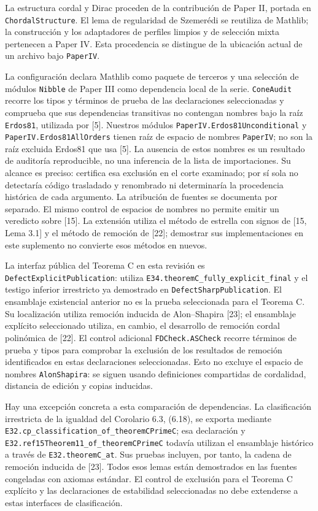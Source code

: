\documentclass[spanish,11pt,a4paper]{article}
\begin{document}
La estructura cordal y Dirac proceden de la contribución de Paper II,
portada en \nolinkurl{ChordalStructure}. El lema de regularidad de
Szemerédi se reutiliza de Mathlib; la construcción y los adaptadores de
perfiles limpios y de selección mixta pertenecen a Paper IV. Esta
procedencia se distingue de la ubicación actual de un archivo bajo
\nolinkurl{PaperIV}.

La configuración declara Mathlib como paquete de terceros y una
selección de módulos \nolinkurl{Nibble} de Paper III como dependencia local
de la serie. \nolinkurl{ConeAudit} recorre los tipos y términos de prueba
de las declaraciones seleccionadas y comprueba que sus dependencias
transitivas no contengan nombres bajo la raíz \nolinkurl{Erdos81},
utilizada por {[}5{]}. Nuestros módulos
\nolinkurl{PaperIV.Erdos81Unconditional} y
\nolinkurl{PaperIV.Erdos81AllOrders} tienen raíz de espacio de nombres
\nolinkurl{PaperIV}; no son la raíz excluida Erdos81 que usa {[}5{]}. La
ausencia de estos nombres es un resultado de auditoría reproducible, no
una inferencia de la lista de importaciones. Su alcance es preciso:
certifica esa exclusión en el corte examinado; por sí sola no detectaría
código trasladado y renombrado ni determinaría la procedencia histórica
de cada argumento. La atribución de fuentes se documenta por separado.
El mismo control de espacios de nombres no permite emitir un veredicto
sobre {[}15{]}. La extensión utiliza el método de estrella con signos de
{[}15, Lema 3.1{]} y el método de remoción de {[}22{]}; demostrar sus
implementaciones en este suplemento no convierte esos métodos en nuevos.

La interfaz pública del Teorema C en esta revisión es
\nolinkurl{DefectExplicitPublication}: utiliza
\nolinkurl{E34.theoremC_fully_explicit_final} y el testigo inferior
irrestricto ya demostrado en \nolinkurl{DefectSharpPublication}. El
ensamblaje existencial anterior no es la prueba seleccionada para el
Teorema C. Su localización utiliza remoción inducida de Alon--Shapira
{[}23{]}; el ensamblaje explícito seleccionado utiliza, en cambio, el
desarrollo de remoción cordal polinómica de {[}22{]}. El control
adicional \nolinkurl{FDCheck.ASCheck} recorre términos de prueba y tipos
para comprobar la exclusión de los resultados de remoción identificados
en estas declaraciones seleccionadas. Esto no excluye el espacio de
nombres \nolinkurl{AlonShapira}: se siguen usando definiciones compartidas
de cordalidad, distancia de edición y copias inducidas.

Hay una excepción concreta a esta comparación de dependencias. La
clasificación irrestricta de la igualdad del Corolario 6.3, (6.18), se
exporta mediante \nolinkurl{E32.cp_classification_of_theoremCPrimeC};
esa declaración y \nolinkurl{E32.ref15Theorem11_of_theoremCPrimeC}
todavía utilizan el ensamblaje histórico a través de
\nolinkurl{E32.theoremC_at}. Sus pruebas incluyen, por tanto, la cadena de
remoción inducida de {[}23{]}. Todos esos lemas están demostrados en las
fuentes congeladas con axiomas estándar. El control de exclusión para el
Teorema C explícito y las declaraciones de estabilidad seleccionadas no
debe extenderse a estas interfaces de clasificación.
\end{document}
